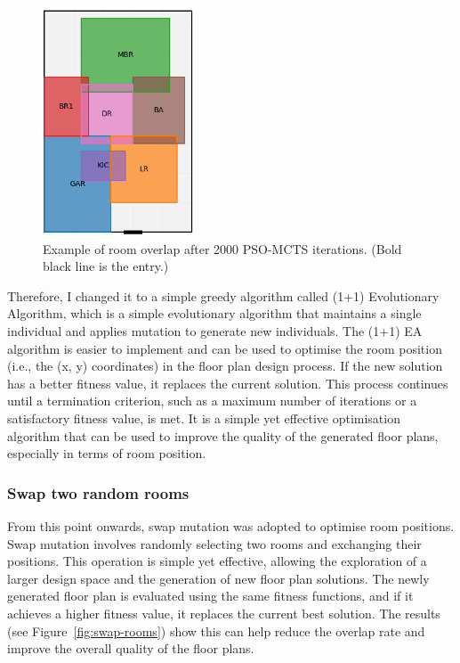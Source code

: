\documentclass[]{article}
\begin{document}
\begin{figure}[h]
    \centering
    \includegraphics[width=0.4\textwidth]{images/pso-mcts-1.png}
    \caption{Example of room overlap after 2000 PSO-MCTS iterations. (Bold black line is the entry.)}
    \label{fig:mcts_overlap}
\end{figure}

Therefore, I changed it to a simple greedy algorithm called (1+1) Evolutionary Algorithm, which is a simple evolutionary algorithm that maintains a single individual and applies mutation to generate new individuals. The (1+1) EA algorithm is easier to implement and can be used to optimise the room position (i.e., the (x, y) coordinates) in the floor plan design process. If the new solution has a better fitness value, it replaces the current solution. This process continues until a termination criterion, such as a maximum number of iterations or a satisfactory fitness value, is met. It is a simple yet effective optimisation algorithm that can be used to improve the quality of the generated floor plans, especially in terms of room position.

\subsubsection{Swap two random rooms}
From this point onwards, swap mutation was adopted to optimise room positions. Swap mutation involves randomly selecting two rooms and exchanging their positions. This operation is simple yet effective, allowing the exploration of a larger design space and the generation of new floor plan solutions. The newly generated floor plan is evaluated using the same fitness functions, and if it achieves a higher fitness value, it replaces the current best solution. The results (see Figure~\ref{fig:swap-rooms}) show this can help reduce the overlap rate and improve the overall quality of the floor plans.
\end{document}
